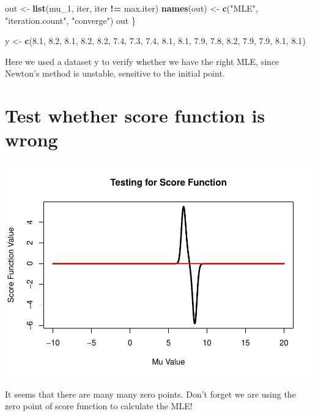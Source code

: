 \documentclass[12pt]{article}
\newenvironment{Shaded}{\begin{snugshade}}{\end{snugshade}}
\newcommand{\DecValTok}[1]{\textcolor[rgb]{0.00,0.00,0.81}{#1}}
\newcommand{\FloatTok}[1]{\textcolor[rgb]{0.00,0.00,0.81}{#1}}
\newcommand{\KeywordTok}[1]{\textcolor[rgb]{0.13,0.29,0.53}{\textbf{#1}}}
\newcommand{\NormalTok}[1]{#1}
\newcommand{\OperatorTok}[1]{\textcolor[rgb]{0.81,0.36,0.00}{\textbf{#1}}}
\newcommand{\StringTok}[1]{\textcolor[rgb]{0.31,0.60,0.02}{#1}}
\begin{document}
\begin{Shaded}
\begin{Highlighting}[]
\NormalTok{  out \textless{}{-}}\StringTok{ }\KeywordTok{list}\NormalTok{(mu\_}\DecValTok{1}\NormalTok{, iter, iter }\OperatorTok{!=}\StringTok{ }\NormalTok{max.iter)}
  \KeywordTok{names}\NormalTok{(out) \textless{}{-}}\StringTok{ }\KeywordTok{c}\NormalTok{(}\StringTok{"MLE"}\NormalTok{, }\StringTok{"iteration.count"}\NormalTok{, }\StringTok{"converge"}\NormalTok{)}
\NormalTok{  out}
\NormalTok{\}}


\NormalTok{y \textless{}{-}}\StringTok{ }\KeywordTok{c}\NormalTok{(}\FloatTok{8.1}\NormalTok{, }\FloatTok{8.2}\NormalTok{, }\FloatTok{8.1}\NormalTok{, }\FloatTok{8.2}\NormalTok{, }\FloatTok{8.2}\NormalTok{, }\FloatTok{7.4}\NormalTok{, }\FloatTok{7.3}\NormalTok{, }\FloatTok{7.4}\NormalTok{, }\FloatTok{8.1}\NormalTok{, }
       \FloatTok{8.1}\NormalTok{, }\FloatTok{7.9}\NormalTok{, }\FloatTok{7.8}\NormalTok{, }\FloatTok{8.2}\NormalTok{, }\FloatTok{7.9}\NormalTok{, }\FloatTok{7.9}\NormalTok{, }\FloatTok{8.1}\NormalTok{, }\FloatTok{8.1}\NormalTok{)}
\end{Highlighting}
\end{Shaded}

Here we used a dataset y to verify whether we have the right MLE, since
Newton's method is unstable, sensitive to the initial point.

\section{Test whether score function is wrong}

\includegraphics{Mixed_Normal_MLE_files/figure-latex/unnamed-chunk-2-1.pdf}

It seems that there are many many zero points. Don't forget we are using
the zero point of score function to calculate the MLE!
\end{document}
